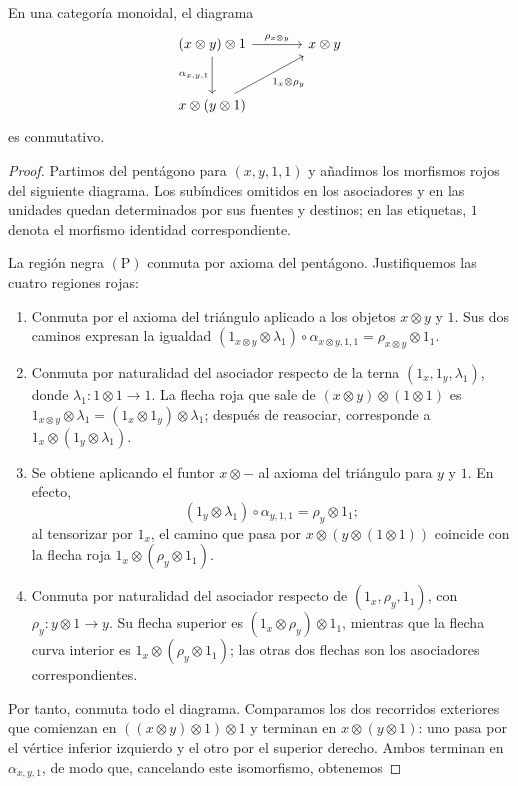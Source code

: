 \begin{lema}\label{lema:coherencia}
En una categoría monoidal, el diagrama
\[
\begin{tikzcd}[column sep=large,row sep=large]
(x\otimes y)\otimes1 \arrow[r,"\rho_{x\otimes y}"] \arrow[d,"\alpha_{x,y,1}"'] & x\otimes y\\
x\otimes(y\otimes1) \arrow[ur,"1_x\otimes\rho_y"'] &
\end{tikzcd}
\]
es conmutativo.
\end{lema}
\begin{proof}
Partimos del pentágono para $(x,y,1,1)$ y añadimos los morfismos rojos del siguiente diagrama. Los subíndices omitidos en los asociadores y en las unidades quedan determinados por sus fuentes y destinos; en las etiquetas, $1$ denota el morfismo identidad correspondiente.

La región negra $(\mathrm{P})$ conmuta por axioma del pentágono. Justifiquemos las cuatro regiones rojas:
\begin{enumerate}[label=(\roman*)]
\item Conmuta por el axioma del triángulo aplicado a los objetos $x\otimes y$ y $1$. Sus dos caminos expresan la igualdad $(1_{x\otimes y}\otimes\lambda_1)\circ\alpha_{x\otimes y,1,1}=\rho_{x\otimes y}\otimes1_1$.
\item Conmuta por naturalidad del asociador respecto de la terna $(1_x,1_y,\lambda_1)$, donde $\lambda_1\colon1\otimes1\to1$. La flecha roja que sale de $(x\otimes y)\otimes(1\otimes1)$ es $1_{x\otimes y}\otimes\lambda_1=(1_x\otimes1_y)\otimes\lambda_1$; después de reasociar, corresponde a $1_x\otimes(1_y\otimes\lambda_1)$.
\item Se obtiene aplicando el funtor $x\otimes-$ al axioma del triángulo para $y$ y $1$. En efecto,
\[
(1_y\otimes\lambda_1)\circ\alpha_{y,1,1}=\rho_y\otimes1_1;
\]
 al tensorizar por $1_x$, el camino que pasa por $x\otimes(y\otimes(1\otimes1))$ coincide con la flecha roja $1_x\otimes(\rho_y\otimes1_1)$.
\item Conmuta por naturalidad del asociador respecto de $(1_x,\rho_y,1_1)$, con $\rho_y\colon y\otimes1\to y$. Su flecha superior es $(1_x\otimes\rho_y)\otimes1_1$, mientras que la flecha curva interior es $1_x\otimes(\rho_y\otimes1_1)$; las otras dos flechas son los asociadores correspondientes.
\end{enumerate}
Por tanto, conmuta todo el diagrama. Comparamos los dos recorridos exteriores que comienzan en $((x\otimes y)\otimes1)\otimes1$ y terminan en $x\otimes(y\otimes1)$: uno pasa por el vértice inferior izquierdo y el otro por el superior derecho. Ambos terminan en $\alpha_{x,y,1}$, de modo que, cancelando este isomorfismo, obtenemos

\end{proof}
